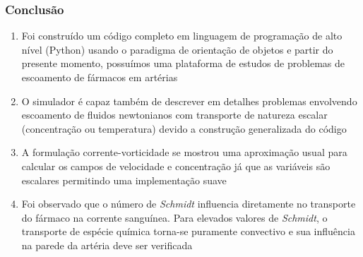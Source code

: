 
\begin{frame}
 \frametitle{\Large Conclusão}
 \vspace{-1cm}
\begin{enumerate}
 \small
 \item Foi construído um código completo em linguagem de programação de alto nível (Python)
       usando o paradigma de orientação de objetos e partir do presente momento, possuímos
       uma plataforma de estudos de problemas de escoamento de fármacos em artérias\\

 \vspace{0.3cm}
 
 \item O simulador é capaz também de descrever em detalhes problemas envolvendo escoamento
       de fluidos newtonianos com transporte de natureza escalar (concentração ou temperatura)
       devido a construção generalizada do código\\

 \vspace{0.3cm}

 \item A formulação corrente-vorticidade se mostrou uma aproximação usual para
       calcular os campos de velocidade e concentração já que as variáveis são
       escalares permitindo uma implementação suave \\

 \vspace{0.3cm}
 
 \item Foi observado que o número de \textit{Schmidt} influencia diretamente no transporte do fármaco
       na corrente sanguínea. Para elevados valores de \textit{Schmidt}, o transporte de espécie química
       torna-se puramente convectivo e sua influência na parede da artéria deve ser verificada
\end{enumerate}
\end{frame}



